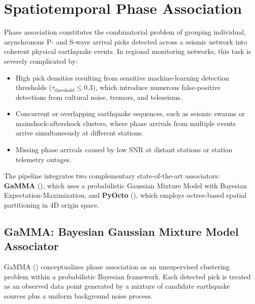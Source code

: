 \section{Spatiotemporal Phase Association}
\label{sec:phase_association}

Phase association constitutes the combinatorial problem of grouping individual, asynchronous P- and S-wave arrival picks detected across a seismic network into coherent physical earthquake events. In regional monitoring networks, this task is severely complicated by:
\begin{itemize}
  \item High pick densities resulting from sensitive machine-learning detection thresholds ($\tau_{\mathrm{threshold}} \le 0.3$), which introduce numerous false-positive detections from cultural noise, tremors, and teleseisms.
  \item Concurrent or overlapping earthquake sequences, such as seismic swarms or mainshock-aftershock clusters, where phase arrivals from multiple events arrive simultaneously at different stations.
  \item Missing phase arrivals caused by low SNR at distant stations or station telemetry outages.
\end{itemize}

The pipeline integrates two complementary state-of-the-art associators: \textbf{GaMMA} (\cite{GaMMA}), which uses a probabilistic Gaussian Mixture Model with Bayesian Expectation-Maximization, and \textbf{PyOcto} (\cite{PyOcto}), which employs octree-based spatial partitioning in 4D origin space.

\subsection{GaMMA: Bayesian Gaussian Mixture Model Associator}
GaMMA (\cite{GaMMA}) conceptualizes phase association as an unsupervised clustering problem within a probabilistic Bayesian framework. Each detected pick is treated as an observed data point generated by a mixture of candidate earthquake sources plus a uniform background noise process.

